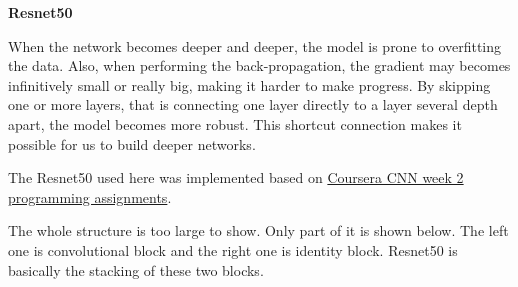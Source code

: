 \documentclass[12pt]{article}
\begin{document}
\textbf{Resnet50}

When the network becomes deeper and deeper, the model is prone to overfitting the data. Also, when performing the back-propagation, the gradient may becomes infinitively small or really big, making it harder to make progress. By skipping one or more layers, that is connecting one layer directly to a layer several depth apart, the model becomes more robust. This shortcut connection makes it possible for us to build deeper networks.

The Resnet50 used here was implemented based on \href{https://www.coursera.org/learn/convolutional-neural-networks?specialization=deep-learning#syllabus}{Coursera CNN week 2 programming assignments}.

The whole structure is too large to show. Only part of it is shown below. The left one is convolutional block and the right one is identity block. Resnet50 is basically the stacking of these two blocks.
\begin{figure}[H]
\captionsetup[subfigure]{labelformat=empty}
\centering
{}
\end{figure}
\end{document}
